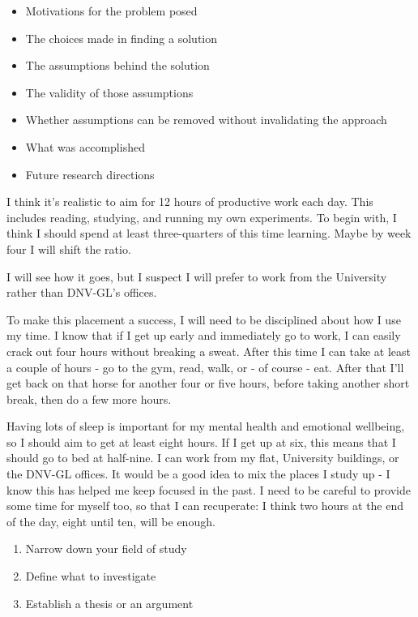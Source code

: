 \documentclass[idxtotoc,hyperref,openany]{labbook} %
\begin{document}
\begin{itemize}
\item Motivations for the problem posed
\item The choices made in finding a solution
\item The assumptions behind the solution
\item The validity of those assumptions
\item Whether assumptions can be removed without invalidating the approach
\item What was accomplished
\item Future research directions
\end{itemize}
\newpage

I think it's realistic to aim for 12 hours of productive work each day. This includes reading, studying, and running my own experiments. To begin with, I think I should spend at least three-quarters of this time learning. Maybe by week four I will shift the ratio.

 I will see how it goes, but I suspect I will prefer to work from the University rather than DNV-GL's offices.
 
 To make this placement a success, I will need to be disciplined about how I use my time. I know that if I get up early and immediately go to work, I can easily crack out four hours without breaking a sweat. After this time I can take at least a couple of hours - go to the gym, read, walk, or - of course - eat. After that I'll get back on that horse for another four or five hours, before taking another short break, then do a few more hours.
 
 Having lots of sleep is important for my mental health and emotional wellbeing, so I should aim to get at least eight hours. If I get up at six, this means that I should go to bed at half-nine. I can work from my flat, University buildings, or the DNV-GL offices. It would be a good idea to mix the places I study up - I know this has helped me keep focused in the past. I need to be careful to provide some time for myself too, so that I can recuperate: I think two hours at the end of the day, eight until ten, will be enough.
 
 \begin{enumerate}
 \item Narrow down your field of study
 \item Define what to investigate
 \item Establish a thesis or an argument
 \end{enumerate}
\end{document}

